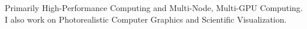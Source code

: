 Primarily High-Performance Computing and Multi-Node, Multi-GPU Computing. I also work on Photorealistic Computer Graphics and Scientific Visualization.